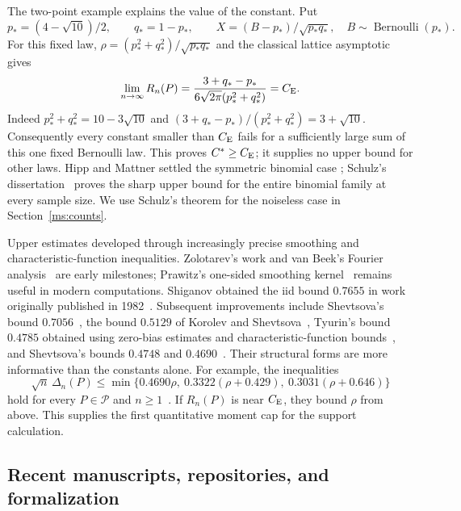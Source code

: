 The two-point example explains the value of the constant. Put
\[
 p_*=(4-\sqrt{10})/2,\qquad q_*=1-p_*,\qquad
 X=(B-p_*)/\sqrt{p_*q_*},\quad B\sim\operatorname{Bernoulli}(p_*).
\]
For this fixed law, $\rho=(p_*^2+q_*^2)/\sqrt{p_*q_*}$ and the
classical lattice asymptotic gives
\begin{equation}\label{ms:bernoulli-limit}
 \lim_{n\to\infty}R_n(P)
 =\frac{3+q_*-p_*}{6\sqrt{2\pi}(p_*^2+q_*^2)}=C_{\mathrm E}.
\end{equation}
Indeed $p_*^2+q_*^2=10-3\sqrt{10}$ and
$(3+q_*-p_*)/(p_*^2+q_*^2)=3+\sqrt{10}$.
Consequently every constant smaller than $C_{\mathrm E}$ fails for a sufficiently
large sum of this one fixed Bernoulli law. This proves $C^*\ge C_{\mathrm E}$;
it supplies no upper bound for other laws. Hipp and Mattner settled the symmetric binomial case
\cite{HippMattner2008}; Schulz's dissertation~\cite{Schulz2016} proves
the sharp upper bound for the entire binomial family at every sample size. We use Schulz's theorem for the noiseless case in
Section~\ref{ms:counts}.

Upper estimates developed through increasingly precise smoothing and
characteristic-function inequalities. Zolotarev's work and van Beek's
Fourier analysis~\cite{Zolotarev1967,vanBeek1972} are early milestones;
Prawitz's one-sided smoothing kernel~\cite{Prawitz1972} remains useful in
modern computations. Shiganov obtained the iid bound $0.7655$ in work originally published in
1982~\cite{Shiganov1986,Tyurin2009}. Subsequent improvements include Shevtsova's bound
$0.7056$~\cite{Shevtsova2007}, the bound $0.5129$ of Korolev and
Shevtsova~\cite{KorolevShevtsova2010}, Tyurin's bound $0.4785$ obtained
using zero-bias estimates and characteristic-function bounds~\cite{Tyurin2010}, and Shevtsova's bounds
$0.4748$ and $0.4690$~\cite{Shevtsova2011,Shevtsova2013}.
Their structural forms are more informative than the constants alone.
For example, the inequalities
\begin{equation}\label{ms:structural-classical}
 \sqrt n\,\Delta_n(P)\le
 \min\{0.4690\rho,\ 0.3322(\rho+0.429),\
                          0.3031(\rho+0.646)\}
\end{equation}
hold for every $P\in\mathcal P$ and $n\ge1$~\cite{Shevtsova2013}.
If $R_n(P)$ is near $C_{\mathrm E}$, they bound $\rho$ from above. This supplies the
first quantitative moment cap for the support calculation.

\subsection{Recent manuscripts, repositories, and formalization}

